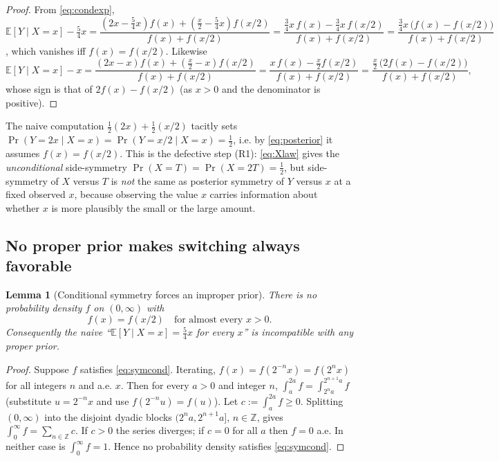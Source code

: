 \documentclass{amsart}
\theoremstyle{plain}
\newtheorem{lemma}{Lemma}
\theoremstyle{definition}
\begin{document}
\begin{proof}
From \eqref{eq:condexp},
$\mathbb E[Y\mid X=x]-\tfrac54 x
=\dfrac{(2x-\tfrac54x)f(x)+(\tfrac x2-\tfrac54x)f(x/2)}{f(x)+f(x/2)}
=\dfrac{\tfrac34 x\,f(x)-\tfrac34 x\,f(x/2)}{f(x)+f(x/2)}
=\dfrac{\tfrac34 x\,\bigl(f(x)-f(x/2)\bigr)}{f(x)+f(x/2)}$,
which vanishes iff $f(x)=f(x/2)$. Likewise
\[
\mathbb E[Y\mid X=x]-x
=\frac{(2x-x)f(x)+(\tfrac x2-x)f(x/2)}{f(x)+f(x/2)}
=\frac{x\,f(x)-\tfrac x2 f(x/2)}{f(x)+f(x/2)}
=\frac{\tfrac x2\,\bigl(2f(x)-f(x/2)\bigr)}{f(x)+f(x/2)} ,
\]
whose sign is that of $2f(x)-f(x/2)$ (as $x>0$ and the denominator is positive).
\end{proof}

The naive computation $\tfrac12(2x)+\tfrac12(x/2)$ tacitly sets
$\Pr(Y=2x\mid X=x)=\Pr(Y=x/2\mid X=x)=\tfrac12$, i.e. by \eqref{eq:posterior}
it assumes $f(x)=f(x/2)$. This is the defective step (R1): \eqref{eq:Xlaw} gives
the \emph{unconditional} side-symmetry $\Pr(X=T)=\Pr(X=2T)=\tfrac12$, but
side-symmetry of $X$ versus $T$ is \emph{not} the same as posterior symmetry of
$Y$ versus $x$ at a fixed observed $x$, because observing the value $x$ carries
information about whether $x$ is more plausibly the small or the large amount.

\subsection{No proper prior makes switching always favorable}

\begin{lemma}[Conditional symmetry forces an improper prior]\label{lem:noproper}
There is no probability density $f$ on $(0,\infty)$ with
\begin{equation}\label{eq:symcond}
f(x)=f(x/2)\quad\text{for almost every }x>0 .
\end{equation}
Consequently the naive ``$\mathbb E[Y\mid X=x]=\tfrac54x$ for every $x$'' is
incompatible with any proper prior.
\end{lemma}

\begin{proof}
Suppose $f$ satisfies \eqref{eq:symcond}. Iterating, $f(x)=f(2^{-n}x)=f(2^{n}x)$
for all integers $n$ and a.e. $x$. Then for every $a>0$ and integer $n$,
$\int_{a}^{2a} f = \int_{2^n a}^{2^{n+1}a} f$ (substitute $u=2^{-n}x$ and use
$f(2^{-n}u)=f(u)$). Let $c:=\int_a^{2a} f\ge 0$. Splitting $(0,\infty)$ into the
disjoint dyadic blocks $(2^n a,2^{n+1}a]$, $n\in\mathbb Z$, gives
$\int_0^\infty f=\sum_{n\in\mathbb Z} c$. If $c>0$ the series diverges; if $c=0$
for all $a$ then $f=0$ a.e. In neither case is $\int_0^\infty f=1$. Hence no
probability density satisfies \eqref{eq:symcond}.
\end{proof}
\end{document}
